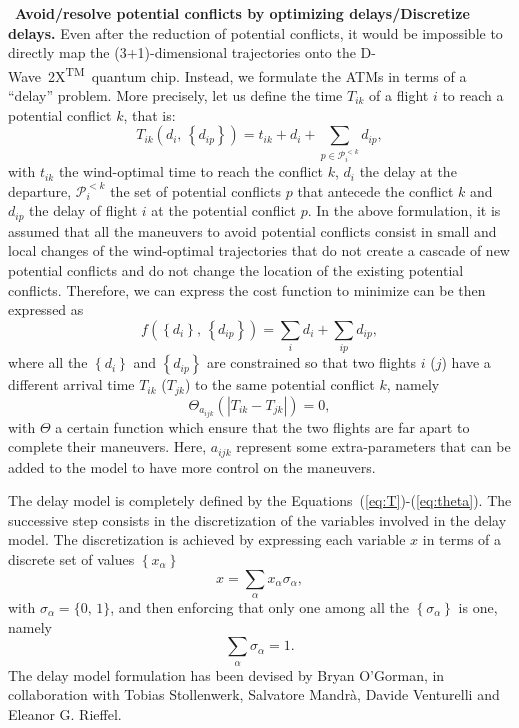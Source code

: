 \documentclass[9pt]{extarticle}
\newcommand{\equationname}{Equation}
\newcommand{\DW}{\mbox{D-Wave 2X\textsuperscript{TM}}~}
\begin{document}
\begin{changemargin}{0.5cm}{0cm}
\textbullet~\textbf{Avoid/resolve potential conflicts by optimizing delays/Discretize delays.} Even after the reduction of potential conflicts, it would be impossible to directly
map the (3+1)-dimensional trajectories onto the \DW quantum chip. Instead, we formulate the ATMs in terms of a ``delay'' problem. More precisely,
let us define the time $T_{ik}$ of a flight $i$ to reach a potential conflict $k$, that is:
\begin{equation}\label{eq:T}
	T_{ik}(d_i,\,\left\{d_{ip}\right\}) = t_{ik} + d_i + \sum_{p\in \mathcal{P}^{<k}_i} d_{ip},
\end{equation}
with $t_{ik}$ the wind-optimal time to reach the conflict $k$, $d_i$ the delay at the departure, 
$\mathcal{P}^{<k}_{i}$ the set of potential conflicts $p$ that antecede the conflict $k$ and $d_{ip}$ the delay
of flight $i$ at the potential conflict $p$. In the above formulation, it is assumed that all the maneuvers to avoid potential conflicts
consist in small and local changes of the wind-optimal trajectories that do not create a cascade of new potential conflicts and do not
change the location of the existing potential conflicts. Therefore, we can express the cost function to minimize can be then expressed as
\begin{equation}\label{eq:f}
	f(\left\{d_i\right\},\,\left\{d_{ip}\right\})= \sum_{i} d_i + \sum_{ip} d_{ip},
\end{equation}
where all the $\left\{d_i\right\}$ and $\left\{d_{ip}\right\}$ are constrained so that two flights $i$ ($j$) have a different arrival time
$T_{ik}$ ($T_{jk}$) to the same potential conflict $k$, namely
\begin{equation}\label{eq:theta}
	\Theta_{a_{ijk}}(\left|T_{ik} - T_{jk}\right|) = 0,
\end{equation}
with $\Theta$ a certain function which ensure that the two flights are far apart to complete their maneuvers. Here, $a_{ijk}$ represent
some extra-parameters that can be added to the model to have more control on the maneuvers. 

The delay model is completely defined by the \equationname{s}~(\ref{eq:T})-(\ref{eq:theta}). The successive step
consists in the discretization of the variables involved in the delay model. The discretization is achieved by expressing each variable $x$ in terms 
of a discrete set of values $\left\{x_\alpha\right\}$
\begin{equation}\label{eq:discr}
	x = \sum_{\alpha} x_{\alpha}\sigma_\alpha,
\end{equation}
with $\sigma_{\alpha} = \{0,\,1\}$, and then enforcing that only one among all the $\left\{\sigma_\alpha\right\}$ is one, namely
\begin{equation}\label{eq:constr}
	\sum_\alpha \sigma_\alpha = 1.
\end{equation}
The delay model formulation has been devised by Bryan O'Gorman,
in collaboration with Tobias Stollenwerk, Salvatore Mandr\`a, Davide Venturelli and Eleanor G. Rieffel.
\end{changemargin}
\end{document}
